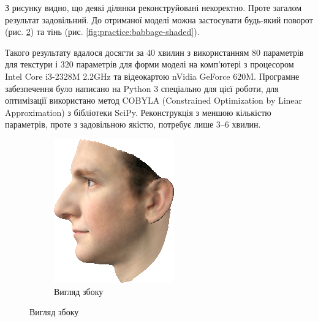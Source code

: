 З рисунку видно, що деякі ділянки реконструйовані некоректно.
Проте загалом результат задовільний.
До отриманої моделі можна застосувати будь-який поворот
(рис. \ref{fig:practice:babbage-profile})
та тінь
(рис. \ref{fig:practice:babbage-shaded}).

Такого результату вдалося досягти за $40$ хвилин
з використанням $80$ параметрів для текстури
і $320$ параметрів для форми моделі
на комп'ютері з процесором Intel Core i3-2328M 2.2GHz
та відеокартою nVidia GeForce 620M.
Програмне забезпечення було написано на Python 3 спеціально для цієї роботи,
для оптимізації використано метод COBYLA
(Constrained Optimization by Linear Approximation)
\cite{Powell1994} з бібліотеки SciPy.
Реконструкція з меншою кількістю параметрів,
проте з задовільною якістю,
потребує лише 3--6 хвилин.

\begin{figure}[h]
  \centering
  \begin{subfigure}[b]{0.4\textwidth}
    \centering
    \includegraphics[width=\textwidth]{images/babbage-profile}
    \caption{Вигляд збоку}
    \label{fig:practice:babbage-profile}
  \end{subfigure}

\end{figure}
